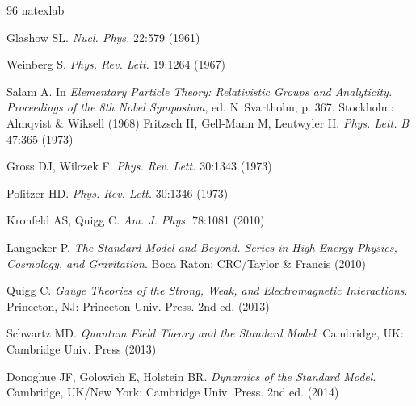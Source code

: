 \documentclass{ar-1col}
\begin{document}
\begin{thebibliography}{96}
\expandafter\ifx\csname
natexlab\endcsname\relax\def\natexlab#1{#1}\fi

Glashow SL. \textit{Nucl. Phys.} 22:579 (1961)

Weinberg S. \textit{Phys. Rev. Lett.} 19:1264 (1967)

Salam A.  In \textit{Elementary Particle Theory: Relativistic
Groups and Analyticity. Proceedings of the 8th Nobel Symposium},
ed. N~Svartholm, p. 367. Stockholm: Almqvist \& Wiksell
 (1968)
Fritzsch H, Gell-Mann M, Leutwyler H. \textit{Phys. Lett.} \textit{B} 47:365
(1973)

Gross DJ, Wilczek F. \textit{Phys. Rev. Lett.} 30:1343 (1973)

Politzer HD. \textit{Phys. Rev. Lett.} 30:1346 (1973)

Kronfeld AS, Quigg C. \textit{Am. J. Phys.} 78:1081 (2010)

Langacker P. \textit{The Standard Model and Beyond. Series in
High Energy Physics, Cosmology, and Gravitation}. Boca Raton:
CRC/Taylor \& Francis (2010)

Quigg C. \textit{Gauge Theories of the Strong, Weak, and
Electromagnetic Interactions}. Princeton, NJ: Princeton
Univ. Press. 2nd ed. (2013)

Schwartz MD. \textit{Quantum Field Theory and the Standard Model}.
Cambridge, UK: Cambridge Univ. Press (2013)

Donoghue JF, Golowich E, Holstein BR. \textit{Dynamics of the
Standard Model}. Cambridge, UK/New York: Cambridge
Univ. Press. 2nd ed. (2014)

\end{thebibliography}



 
\end{document}
